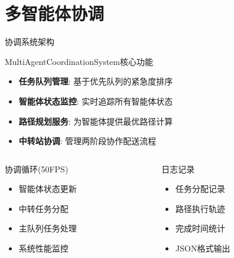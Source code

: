 \documentclass[
10pt,
aspectratio=169,
]{beamer}
\begin{document}
\section{多智能体协调}

\begin{frame}{协调系统架构}
    \begin{block}{MultiAgentCoordinationSystem核心功能}
        \begin{itemize}
            \item \textbf{任务队列管理}: 基于优先队列的紧急度排序
            \item \textbf{智能体状态监控}: 实时追踪所有智能体状态
            \item \textbf{路径规划服务}: 为智能体提供最优路径计算
            \item \textbf{中转站协调}: 管理两阶段协作配送流程
        \end{itemize}
    \end{block}
    
    \begin{columns}
        \begin{column}{0.5\textwidth}
            \begin{alertblock}{协调循环(50FPS)}
                \begin{itemize}
                    \item 智能体状态更新
                    \item 中转任务分配
                    \item 主队列任务处理
                    \item 系统性能监控
                \end{itemize}
            \end{alertblock}
        \end{column}
        \begin{column}{0.5\textwidth}
            \begin{exampleblock}{日志记录}
                \begin{itemize}
                    \item 任务分配记录
                    \item 路径执行轨迹
                    \item 完成时间统计
                    \item JSON格式输出
                \end{itemize}
            \end{exampleblock}
        \end{column}
    \end{columns}
\end{frame}
\end{document}
